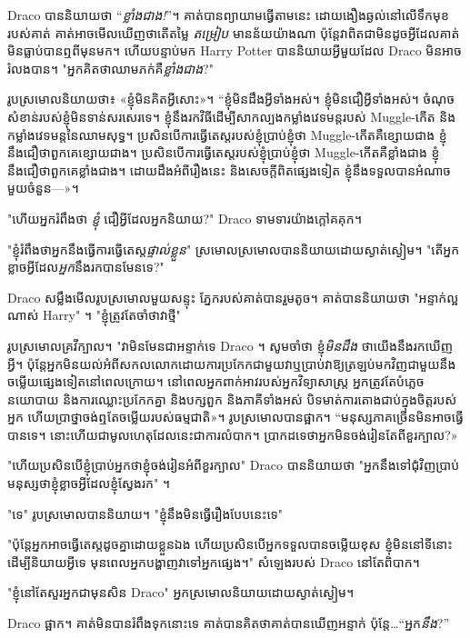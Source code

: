 {{{Draco បាននិយាយថា “\emph{ខ្លាំងជាង!}”។ គាត់​បាន​ព្យាយាម​ធ្វើ​តាម​នេះ ដោយ​ងឿង​ឆ្ងល់​នៅ​លើ​ទឹក​មុខ​របស់​គាត់ គាត់​អាច​មើល​ឃើញ​ថា​តើ​តម្លៃ \emph{តម្រៀប} មាន​ន័យ​យ៉ាង​ណា ប៉ុន្តែ​វា​ពិត​ជា​មិន​ដូច​អ្វី​ដែល​គាត់​មិន​ធ្លាប់​បាន​ឮ​ពី​មុន​មក។ ហើយបន្ទាប់មក Harry Potter បាននិយាយអ្វីមួយដែល Draco មិនអាចរំលងបាន។ "អ្នកគិតថាឈាមភក់គឺ\emph{ខ្លាំងជាង}?"

រូប​ស្រមោល​និយាយ​ថា៖ «ខ្ញុំ​មិន​គិត​អ្វី​សោះ»។ “ខ្ញុំមិនដឹងអ្វីទាំងអស់។ ខ្ញុំមិនជឿអ្វីទាំងអស់។ ចំណុចសំខាន់របស់ខ្ញុំមិនទាន់សរសេរទេ។ ខ្ញុំនឹងរកវិធីដើម្បីសាកល្បងកម្លាំងវេទមន្តរបស់ Muggle-កើត និងកម្លាំងវេទមន្តនៃឈាមសុទ្ធ។ ប្រសិនបើការធ្វើតេស្តរបស់ខ្ញុំប្រាប់ខ្ញុំថា Muggle-កើតគឺខ្សោយជាង ខ្ញុំនឹងជឿថាពួកគេខ្សោយជាង។ ប្រសិនបើការធ្វើតេស្តរបស់ខ្ញុំប្រាប់ខ្ញុំថា Muggle-កើតគឺខ្លាំងជាង ខ្ញុំនឹងជឿថាពួកគេខ្លាំងជាង។ ដោយ​ដឹង​អំពី​រឿង​នេះ និង​សេចក្ដី​ពិត​ផ្សេង​ទៀត ខ្ញុំ​នឹង​ទទួល​បាន​អំណាច​មួយ​ចំនួន—»។

"ហើយអ្នករំពឹងថា \emph{ខ្ញុំ} ជឿអ្វីដែលអ្នកនិយាយ?" Draco ទាមទារយ៉ាងក្តៅគគុក។

"ខ្ញុំរំពឹងថាអ្នកនឹងធ្វើការធ្វើតេស្ត\emph{ផ្ទាល់ខ្លួន}" ស្រមោលស្រមោលបាននិយាយដោយស្ងាត់ស្ងៀម។ "តើអ្នកខ្លាចអ្វីដែល\emph{អ្នក}នឹងរកបានមែនទេ?"

Draco សម្លឹងមើលរូបស្រមោលមួយសន្ទុះ ភ្នែករបស់គាត់បានរួមតូច។ គាត់បាននិយាយថា "អន្ទាក់ល្អណាស់ Harry" ។ "ខ្ញុំត្រូវតែចាំថាវាថ្មី"

រូបស្រមោលគ្រវីក្បាល។ "វាមិនមែនជាអន្ទាក់ទេ Draco ។ សូមចាំថា ខ្ញុំ\emph{មិនដឹង} ថាយើងនឹងរកឃើញអ្វី។ ប៉ុន្តែ​អ្នក​មិន​យល់​អំពី​សកលលោក​ដោយ​ការ​ប្រកែក​ជាមួយ​វា​ឬ​ប្រាប់​វា​ឱ្យ​ត្រឡប់​មក​វិញ​ជាមួយ​នឹង​ចម្លើយ​ផ្សេង​ទៀត​នៅ​ពេល​ក្រោយ​។ នៅពេលអ្នកពាក់អាវរបស់អ្នកវិទ្យាសាស្ត្រ អ្នកត្រូវតែបំភ្លេចនយោបាយ និងការឈ្លោះប្រកែកគ្នា និងបក្សពួក និងភាគីទាំងអស់ បិទមាត់ការតោងជាប់ក្នុងចិត្តរបស់អ្នក ហើយប្រាថ្នាចង់ឮតែចម្លើយរបស់ធម្មជាតិ»។ រូប​ស្រមោល​បាន​ផ្អាក។ “មនុស្សភាគច្រើនមិនអាចធ្វើបានទេ។ នោះហើយជាមូលហេតុដែលនេះជាការលំបាក។ ប្រាកដ​ទេ​ថា​អ្នក​មិន​ចង់​រៀន​តែ​ពី​ខួរក្បាល?»

"ហើយប្រសិនបើខ្ញុំប្រាប់អ្នកថាខ្ញុំចង់រៀនអំពីខួរក្បាល" Draco បាននិយាយថា "អ្នកនឹងទៅជុំវិញប្រាប់មនុស្សថាខ្ញុំខ្លាចអ្វីដែលខ្ញុំស្វែងរក" ។

"ទេ" រូបស្រមោលបាននិយាយ។ "ខ្ញុំនឹងមិនធ្វើរឿងបែបនេះទេ"

"ប៉ុន្តែអ្នកអាចធ្វើតេស្តដូចគ្នាដោយខ្លួនឯង ហើយប្រសិនបើអ្នកទទួលបានចម្លើយខុស ខ្ញុំមិននៅទីនោះដើម្បីនិយាយអ្វីទេ មុនពេលអ្នកបង្ហាញវាទៅអ្នកផ្សេង។" សំឡេងរបស់ Draco នៅតែពិបាក។

"ខ្ញុំនៅតែសួរអ្នកជាមុនសិន Draco" អ្នកស្រមោលនិយាយដោយស្ងាត់ស្ងៀម។

Draco ផ្អាក។ គាត់​មិន​បាន​រំពឹង​ទុក​នោះ​ទេ គាត់​បាន​គិត​ថា​គាត់​បាន​ឃើញ​អន្ទាក់ ប៉ុន្តែ…“អ្នក​\emph{នឹង}?”

}}}
